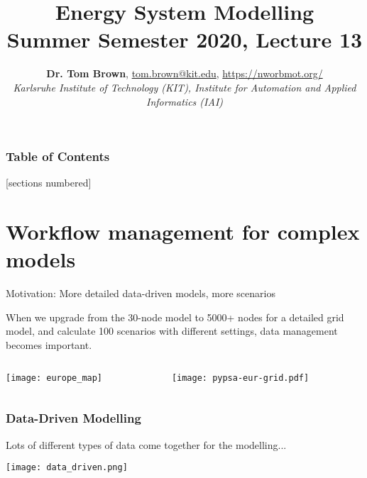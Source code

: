 \documentclass[10pt,aspectratio=169,dvipsnames]{beamer}
\title{Energy System Modelling\\ Summer Semester 2020, Lecture 13}
\author{
  {\bf Dr. Tom Brown}, \href{mailto:tom.brown@kit.edu}{tom.brown@kit.edu}, \url{https://nworbmot.org/}\\
  \emph{Karlsruhe Institute of Technology (KIT), Institute for Automation and Applied Informatics (IAI)}
}
\date{}
\begin{document}
\maketitle


\begin{frame}

  \frametitle{Table of Contents}
  [sections numbered]
  \tableofcontents[hideallsubsections]
\end{frame}


\section{Workflow management for complex models}


\begin{frame}{Motivation: More detailed data-driven models, more scenarios}


When we upgrade from the 30-node model to 5000+ nodes for a detailed grid model, and calculate 100 scenarios with different settings, \alert{data management becomes important}.

\begin{columns}[T]
  \begin{column}{6cm}

    \texttt{[image: europe\_map]}
  \end{column}

  \begin{column}{6cm}

    \texttt{[image: pypsa-eur-grid.pdf]}
  \end{column}
\end{columns}



\end{frame}




\begin{frame}
  \frametitle{Data-Driven Modelling}

  Lots of different types of data come together for the modelling...


    \texttt{[image: data\_driven.png]}

\end{frame}
\end{document}
